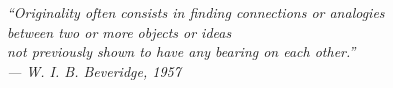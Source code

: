 \clearpage
\thispagestyle{empty}

\vspace*{9.7cm}
  \begin{minipage}{0.9\textwidth}
    \itshape
    ``Originality often consists in finding connections or analogies\\ between two or more objects or ideas\\ not previously shown to have any bearing on each other.''\\[0.5em]
    \raggedleft\normalfont
    --- W. I. B. Beveridge, 1957
  \end{minipage}

\clearpage
\nocite{beveridge1957art}